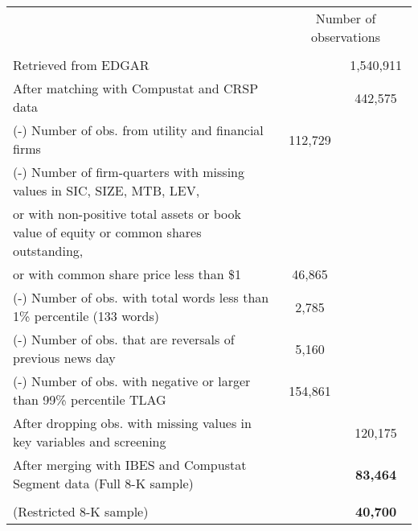 \begin{table}[htbp]
\begin{tabular}{lcc}
     &   \multicolumn{2}{c}{Number of observations}\\
      & &  \\
    Retrieved from EDGAR & & 1,540,911 \\
    After matching with Compustat and CRSP data  & & 442,575 \\
    (-) Number of obs. from utility and financial firms & 112,729 & \\
    (-) Number of firm-quarters with missing values in SIC, SIZE, MTB, LEV, & & \\
    \hspace{5mm}or with non-positive total assets or book value of equity or common shares outstanding, & & \\
    \hspace{5mm}or with common share price less than \$1 & 46,865 & \\
    (-) Number of obs. with total words less than 1\% percentile (133 words) & 2,785 & \\
    (-) Number of obs. that are reversals of previous news day & 5,160 & \\
    (-) Number of obs. with negative or larger than 99\% percentile TLAG  & 154,861 & \\
    \bottomrule
    After dropping obs. with missing values in key variables and screening  & & 120,175 \\
    After merging with IBES and Compustat Segment data (Full 8-K sample) & & \textbf{83,464}  \\
    \begin{comment}
    	After dropping obs. with TLAG larger than four (five) days after (before) the 8-K reform &  & \\
    	(Restricted 8-K sample) &  & \textbf{40,700} 
    \end{comment}
    \end{tabular}%
\end{table}%

